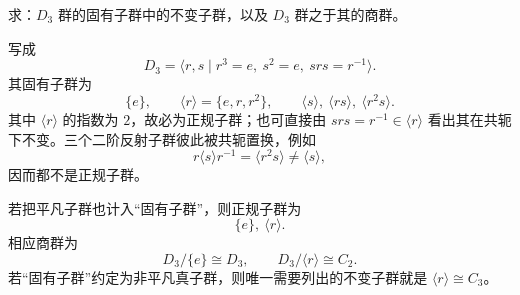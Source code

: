 
\begin{question}[10 分]
求：$D_3$ 群的固有子群中的不变子群，以及 $D_3$ 群之于其的商群。
\begin{solution}
写成
\[
D_3=\langle r,s\mid r^3=e,\ s^2=e,\ srs=r^{-1}\rangle .
\]
其固有子群为
\[
\{e\},\qquad \langle r\rangle=\{e,r,r^2\},\qquad
\langle s\rangle,\ \langle rs\rangle,\ \langle r^2s\rangle .
\]
其中 $\langle r\rangle$ 的指数为 $2$，故必为正规子群；也可直接由
$srs=r^{-1}\in\langle r\rangle$ 看出其在共轭下不变。三个二阶反射子群彼此被共轭置换，例如
\[
r\langle s\rangle r^{-1}=\langle r^2s\rangle\neq\langle s\rangle,
\]
因而都不是正规子群。

若把平凡子群也计入“固有子群”，则正规子群为
\[
\boxed{\{e\},\ \langle r\rangle}.
\]
相应商群为
\[
\boxed{D_3/\{e\}\cong D_3},\qquad
\boxed{D_3/\langle r\rangle\cong C_2}.
\]
若“固有子群”约定为非平凡真子群，则唯一需要列出的不变子群就是 $\langle r\rangle\cong C_3$。
\end{solution}
\end{question}


